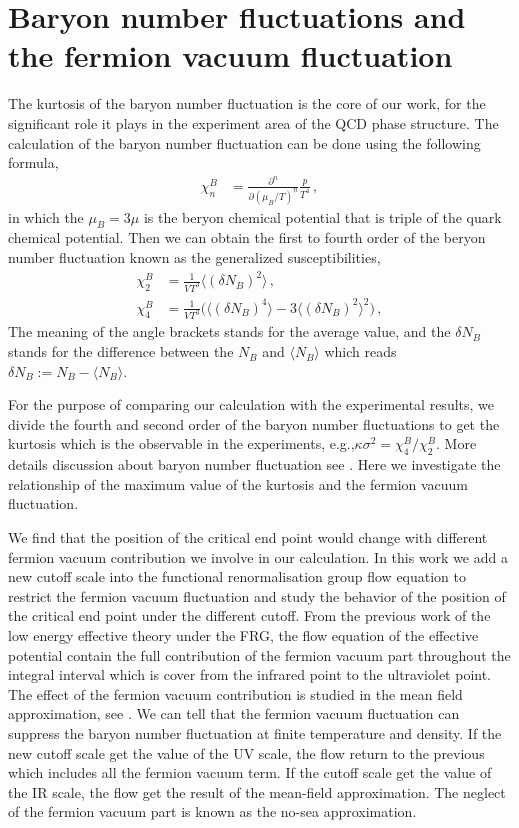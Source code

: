 \documentclass[%
reprint,
superscriptaddress,
showpacs,preprintnumbers,
 amsmath,amssymb,
 aps,
prl,
]{revtex4-1}
\begin{document}
\section{Baryon number fluctuations and the fermion vacuum fluctuation}
\label{sec:EoS}
The kurtosis of the baryon number fluctuation is the core of our work, for the significant role it plays in the experiment area of the QCD phase structure. The calculation of the baryon number fluctuation can be done using the following formula, 
\begin{align}
   \chi_n^{B}&=\frac{\partial^n}{\partial (\mu_B/T)^n}\frac{p}{T^4}\,,\label{eq:suscept}
\end{align}
in which the $\mu_B=3\mu$ is the beryon chemical potential that is triple of the quark chemical potential. Then we can obtain the first to fourth order of the beryon number fluctuation known as the generalized susceptibilities,
\begin{align}
  \chi_2^B&=\frac{1}{VT^3}\langle(\delta N_B)^2\rangle\,,\\[2ex]
  \chi_4^B&=\frac{1}{VT^3}\Big(\langle(\delta N_B)^4\rangle-3\langle(\delta N_B)^2\rangle^2\Big)\,,
\end{align}
The meaning of the angle brackets stands for the average value, and the $\delta N_B$ stands for the difference between the $N_B$ and $\langle N_B\rangle$ which reads $\delta N_B:=N_B - \langle N_B\rangle$.\par
For the purpose of comparing our calculation with the experimental results, we divide the fourth and second order of the baryon number fluctuations to get the kurtosis which is the observable in the experiments, e.g.,$\kappa\sigma^2=\chi^B_4/\chi^B_2$. More details discussion about baryon number fluctuation see \cite{Fu:2015naa}. Here we investigate the relationship of the maximum value of the kurtosis and the fermion vacuum fluctuation.
\par We find that the position of the critical end point would change with different fermion vacuum contribution we involve in our calculation. In this work we add a new cutoff scale into the functional renormalisation group flow equation to restrict the fermion vacuum fluctuation and study the behavior of the position of the critical end point under the different cutoff. From the previous work of the low energy effective theory under the FRG, the flow equation of the effective potential contain the full contribution of the fermion vacuum part throughout the integral interval which is cover from the infrared point to the ultraviolet point. The effect of the fermion vacuum contribution is studied in the mean field approximation, see \cite{Skokov:2010sf}. We can tell that the fermion vacuum fluctuation can suppress the baryon number fluctuation at finite temperature and density. If the new cutoff scale get the value of the UV scale, the flow return to the previous which includes all the fermion vacuum term. If the cutoff scale get the value of the IR scale, the flow get the result of the mean-field approximation. The neglect of the fermion vacuum part is known as the no-sea approximation.
\end{document}
